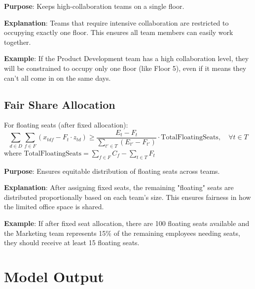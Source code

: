 \documentclass[12pt]{article}
\begin{document}
\textbf{Purpose}: Keeps high-collaboration teams on a single floor.

\textbf{Explanation}: Teams that require intensive collaboration are restricted to occupying exactly one floor. This ensures all team members can easily work together.

\textbf{Example}: If the Product Development team has a high collaboration level, they will be constrained to occupy only one floor (like Floor 5), even if it means they can't all come in on the same days.

\subsection{Fair Share Allocation}
For floating seats (after fixed allocation):
\begin{equation}
\sum_{d \in D} \sum_{f \in F} (x_{tdf} - F_t \cdot z_{td}) \geq \frac{E_t - F_t}{\sum_{t' \in T} (E_{t'} - F_{t'})} \cdot \text{TotalFloatingSeats}, \quad \forall t \in T
\end{equation}
where $\text{TotalFloatingSeats} = \sum_{f \in F} C_f - \sum_{t \in T} F_t$

\textbf{Purpose}: Ensures equitable distribution of floating seats across teams.

\textbf{Explanation}: After assigning fixed seats, the remaining "floating" seats are distributed proportionally based on each team's size. This ensures fairness in how the limited office space is shared.

\textbf{Example}: If after fixed seat allocation, there are 100 floating seats available and the Marketing team represents 15\% of the remaining employees needing seats, they should receive at least 15 floating seats.





\section{Model Output}
\end{document}
